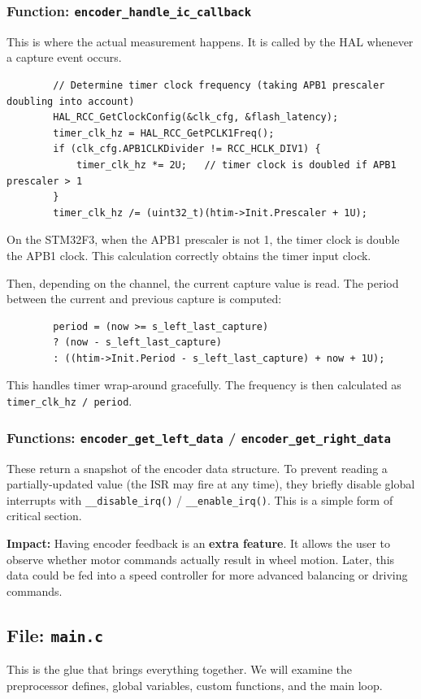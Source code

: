 \documentclass[12pt,a4paper]{article}
\newcommand{\file}[1]{\texttt{#1}}
\newcommand{\func}[1]{\texttt{#1}}
\begin{document}
	\subsubsection*{Function: \func{encoder\_handle\_ic\_callback}}
	This is where the actual measurement happens. It is called by the HAL whenever a capture event occurs.
	\begin{lstlisting}
		// Determine timer clock frequency (taking APB1 prescaler doubling into account)
		HAL_RCC_GetClockConfig(&clk_cfg, &flash_latency);
		timer_clk_hz = HAL_RCC_GetPCLK1Freq();
		if (clk_cfg.APB1CLKDivider != RCC_HCLK_DIV1) {
			timer_clk_hz *= 2U;   // timer clock is doubled if APB1 prescaler > 1
		}
		timer_clk_hz /= (uint32_t)(htim->Init.Prescaler + 1U);
	\end{lstlisting}
	On the STM32F3, when the APB1 prescaler is not 1, the timer clock is double the APB1 clock. This calculation correctly obtains the timer input clock.
	
	Then, depending on the channel, the current capture value is read. The period between the current and previous capture is computed:
	\begin{lstlisting}
		period = (now >= s_left_last_capture) 
		? (now - s_left_last_capture)
		: ((htim->Init.Period - s_left_last_capture) + now + 1U);
	\end{lstlisting}
	This handles timer wrap‑around gracefully. The frequency is then calculated as \texttt{timer\_clk\_hz / period}.
	
	\subsubsection*{Functions: \func{encoder\_get\_left\_data} / \func{encoder\_get\_right\_data}}
	These return a snapshot of the encoder data structure. To prevent reading a partially‑updated value (the ISR may fire at any time), they briefly disable global interrupts with \texttt{\_\_disable\_irq()} / \texttt{\_\_enable\_irq()}. This is a simple form of critical section.
	
	\textbf{Impact:} Having encoder feedback is an \textbf{extra feature}. It allows the user to observe whether motor commands actually result in wheel motion. Later, this data could be fed into a speed controller for more advanced balancing or driving commands.
	
	\subsection{File: \file{main.c}}
	\label{subsec:main}
	This is the glue that brings everything together. We will examine the preprocessor defines, global variables, custom functions, and the main loop.
	
\end{document}
